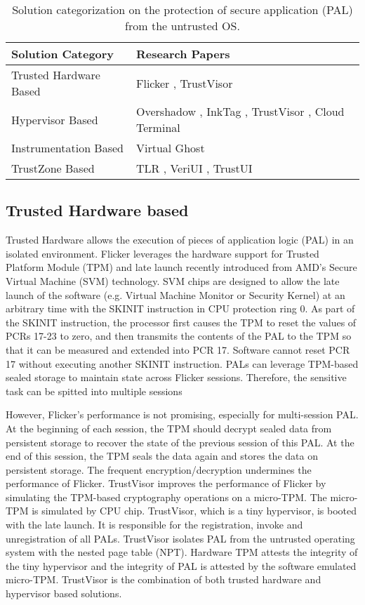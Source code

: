 \begin{table*}[ht]
	\centering
	\begin{tabular}{|l|l|}
		\hline
		\textbf{Solution Category}      & \textbf{Research Papers} \\ \hline
		Trusted Hardware Based & Flicker \cite{Flicker}, TrustVisor \cite{TrustVisor} \\ \hline
		Hypervisor Based       & Overshadow \cite{Overshadow}, InkTag \cite{InkTag}, TrustVisor \cite{TrustVisor}, Cloud Terminal \cite{CloudTerminal}\\ \hline
		Instrumentation Based  & Virtual Ghost \cite{VirtualGhost}\\ \hline
		TrustZone Based        & TLR \cite{TLR}, VeriUI \cite{VeriUI}, TrustUI \cite{TrustUI}\\ \hline
	\end{tabular}
	\caption{Solution categorization on the protection of secure application
	(PAL) from the untrusted OS.}
	\label{my-label}
\end{table*}

\subsection{Trusted Hardware based}

Trusted Hardware allows the execution of pieces of application logic (PAL) in an
isolated environment. Flicker \cite{Flicker} leverages the hardware support for
Trusted Platform Module (TPM) and late launch recently introduced from AMD's
Secure Virtual Machine (SVM) technology. SVM chips are designed to allow the
late launch of the software (e.g. Virtual Machine Monitor or Security Kernel) at
an arbitrary time with the SKINIT instruction in CPU protection ring 0. As part
of the SKINIT instruction, the processor first causes the TPM to reset the
values of PCRs 17-23 to zero, and then transmits the contents of the PAL to the
TPM so that it can be measured and extended into PCR 17. Software cannot reset
PCR 17 without executing another SKINIT instruction. PALs can leverage TPM-based
sealed storage to maintain state across Flicker sessions. Therefore, the
sensitive task can be spitted into multiple sessions

However, Flicker's performance is not promising, especially for multi-session
PAL. At the beginning of each session, the TPM should decrypt sealed data from
persistent storage to recover the state of the previous session of this PAL. At
the end of this session, the TPM seals the data again and stores the data on
persistent storage. The frequent encryption/decryption undermines the
performance of Flicker. TrustVisor \cite{TrustVisor} improves the performance of
Flicker by simulating the TPM-based cryptography operations on a micro-TPM. The
micro-TPM is simulated by CPU chip. TrustVisor, which is a tiny hypervisor, is
booted with the late launch. It is responsible for the registration, invoke and
unregistration of all PALs.  TrustVisor isolates PAL from the untrusted
operating system with the nested page table (NPT). Hardware TPM attests the
integrity of the tiny hypervisor and the integrity of PAL is attested by the
software emulated micro-TPM. TrustVisor is the combination of both trusted
hardware and hypervisor based solutions. 

